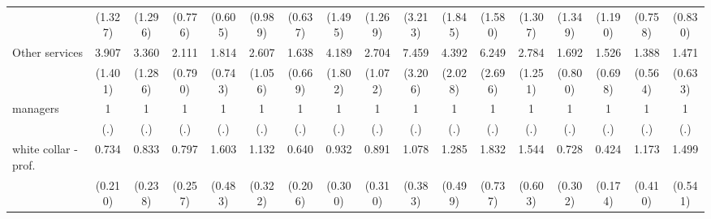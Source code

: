 {\begin{tabular}{l*{16}{c}}
                    &     (1.327)         &     (1.296)         &     (0.776)         &     (0.605)         &     (0.989)         &     (0.637)         &     (1.495)         &     (1.269)         &     (3.213)         &     (1.845)         &     (1.580)         &     (1.307)         &     (1.349)         &     (1.190)         &     (0.758)         &     (0.830)         \\
[1em]
Other services      &       3.907\sym{***}&       3.360\sym{**} &       2.111\sym{*}  &       1.814         &       2.607\sym{*}  &       1.638         &       4.189\sym{***}&       2.704\sym{*}  &       7.459\sym{***}&       4.392\sym{**} &       6.249\sym{***}&       2.784\sym{*}  &       1.692         &       1.526         &       1.388         &       1.471         \\
                    &     (1.401)         &     (1.286)         &     (0.790)         &     (0.743)         &     (1.056)         &     (0.669)         &     (1.802)         &     (1.072)         &     (3.206)         &     (2.028)         &     (2.696)         &     (1.251)         &     (0.800)         &     (0.698)         &     (0.564)         &     (0.633)         \\
[1em]
managers            &           1         &           1         &           1         &           1         &           1         &           1         &           1         &           1         &           1         &           1         &           1         &           1         &           1         &           1         &           1         &           1         \\
                    &         (.)         &         (.)         &         (.)         &         (.)         &         (.)         &         (.)         &         (.)         &         (.)         &         (.)         &         (.)         &         (.)         &         (.)         &         (.)         &         (.)         &         (.)         &         (.)         \\
[1em]
white collar - prof.&       0.734         &       0.833         &       0.797         &       1.603         &       1.132         &       0.640         &       0.932         &       0.891         &       1.078         &       1.285         &       1.832         &       1.544         &       0.728         &       0.424\sym{*}  &       1.173         &       1.499         \\
                    &     (0.210)         &     (0.238)         &     (0.257)         &     (0.483)         &     (0.322)         &     (0.206)         &     (0.300)         &     (0.310)         &     (0.383)         &     (0.499)         &     (0.737)         &     (0.603)         &     (0.302)         &     (0.174)         &     (0.410)         &     (0.541)         \\

\end{tabular}}
